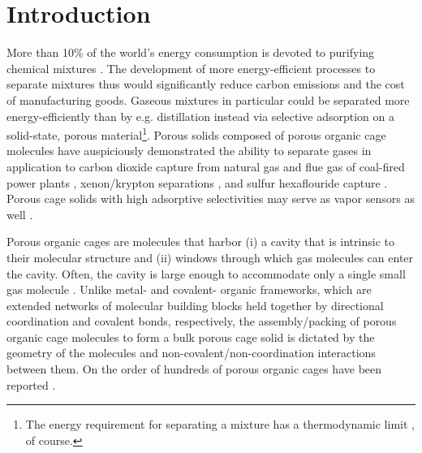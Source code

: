 \documentclass[journal=jacsat,manuscript=article,layout=traditional]{achemso}
\begin{document}
\section{Introduction}
More than 10\% of the world's energy consumption is devoted to purifying chemical mixtures \cite{sholl2016seven}. The development of more energy-efficient processes to separate mixtures thus would significantly reduce carbon emissions and the cost of manufacturing goods. Gaseous mixtures in particular could be separated more energy-efficiently than by e.g. distillation \cite{doe_study} instead via selective adsorption on a solid-state, porous material\footnote[2]{The energy requirement for separating a mixture has a thermodynamic limit \cite{bhown2011analysis}, of course.}. Porous solids composed of porous organic cage molecules \cite{tozawa2009porous} have auspiciously demonstrated the ability to separate gases \cite{hasell2016porous} in application to carbon dioxide capture from natural gas \cite{mastalerz2011salicylbisimine} and flue gas of coal-fired power plants \cite{tian2009amorphous,hong2015porphyrin}, xenon/krypton separations \cite{chen2014separation,patil2016noria}, and sulfur hexaflouride capture \cite{sf6seps}. Porous cage solids with high adsorptive selectivities may serve as vapor sensors as well \cite{brutschy2012porous,brutschy2013direct}.

Porous organic cages \cite{hasell2016porous,holst2010porous,cooper2017porousacs} are molecules that harbor (i) a cavity that is intrinsic to their molecular structure and (ii) windows through which gas molecules can enter the cavity. Often, the cavity is large enough to accommodate only a single small gas molecule \cite{miklitz2017computational}. Unlike metal- \cite{furukawa2013chemistry} and covalent- \cite{diercks2017atom} organic frameworks, which are extended networks of molecular building blocks held together by directional coordination and covalent bonds, respectively, the assembly/packing of porous organic cage molecules to form a bulk porous cage solid is dictated by the geometry of the molecules and non-covalent/non-coordination interactions between them\cite{mckeown2010nanoporous}. 
On the order of hundreds of porous organic cages have been reported \cite{evans2016computational}.
\end{document}

